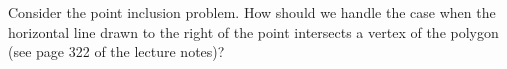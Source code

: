Consider the point inclusion problem.  How should we handle the case
when the horizontal line drawn to the right of the point intersects a
vertex of the polygon (see page 322 of the lecture notes)?
